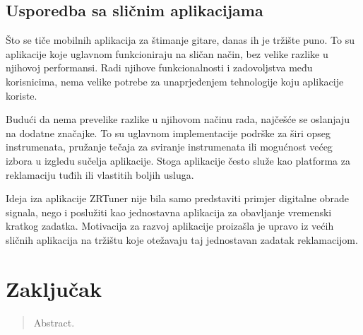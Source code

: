 \documentclass[times, utf8, zavrsni, numeric]{fer}
\begin{document}
\section{Usporedba sa sličnim aplikacijama}
Što se tiče mobilnih aplikacija za štimanje gitare, danas ih je tržište puno. To su aplikacije koje uglavnom funkcioniraju na sličan način, bez velike razlike u njihovoj performansi. Radi njihove funkcionalnosti i zadovoljstva među korisnicima, nema velike potrebe za unaprjeđenjem tehnologije koju aplikacije koriste.

Budući da nema prevelike razlike u njihovom načinu rada, najčešće se oslanjaju na dodatne značajke. To su uglavnom implementacije podrške za širi opseg instrumenata, pružanje tečaja za sviranje instrumenata ili mogućnost većeg izbora u izgledu sučelja aplikacije. Stoga aplikacije često služe kao platforma za reklamaciju tuđih ili vlastitih boljih usluga.

Ideja iza aplikacije ZRTuner nije bila samo predstaviti primjer digitalne obrade signala, nego i poslužiti kao jednostavna aplikacija za obavljanje vremenski kratkog zadatka. Motivacija za razvoj aplikacije proizašla je upravo iz većih sličnih aplikacija na tržištu koje otežavaju taj jednostavan zadatak reklamacijom.



\chapter{Zaključak}




\begin{sazetak}

\end{sazetak}

\begin{abstract}
Abstract.

\end{abstract}
\end{document}
